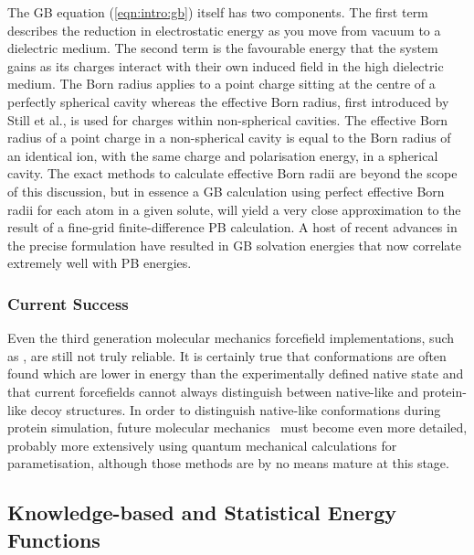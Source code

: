 The GB equation (\ref{eqn:intro:gb}) itself  has two components. The first term describes the reduction in electrostatic
energy as you move from vacuum to a dielectric medium. The second term is the favourable
energy that the system gains as its charges interact with their own induced field in the high dielectric medium. The Born radius applies to a point charge sitting at the centre of a perfectly spherical cavity whereas the effective Born radius, first introduced by Still et al.\cite{COMPCHEM:Still90}, is used for charges within non-spherical cavities. The effective Born radius of a point charge in a non-spherical cavity is equal to the Born radius of an identical ion, with the same charge and polarisation energy, in a spherical cavity. The exact methods to calculate effective
Born radii are beyond the scope of this discussion, but in essence a GB calculation using perfect effective Born radii for each atom in a given solute, will yield a very close approximation to the result of a fine-grid finite-difference PB calculation.
A host of recent advances in the precise formulation \cite{COMPCHEM:Tsu2000,COMPCHEM:Bas2000,COMPCHEM:Sim2001,FORCEFIELD:GB:ADVANCES:A,FORCEFIELD:GB:ADVANCES:B} have
resulted in GB solvation energies that now correlate extremely well with PB energies\cite{FORCEFIELD:PBGB:COMPARE}.



\subsubsection{Current Success}

Even the third generation molecular mechanics forcefield implementations, such as \ambergbsa, are still not truly reliable. It is certainly true that conformations are often found which are lower in energy than the experimentally defined native state\cite{METHOD:Plop}  and that current forcefields cannot always distinguish between native-like and protein-like decoy structures. In order to distinguish native-like conformations during protein simulation, future molecular mechanics \forcefields\ must become even more detailed, probably more extensively using quantum mechanical calculations for parametisation, although those methods are by no means mature at this stage.


\subsection{Knowledge-based and Statistical Energy Functions}


